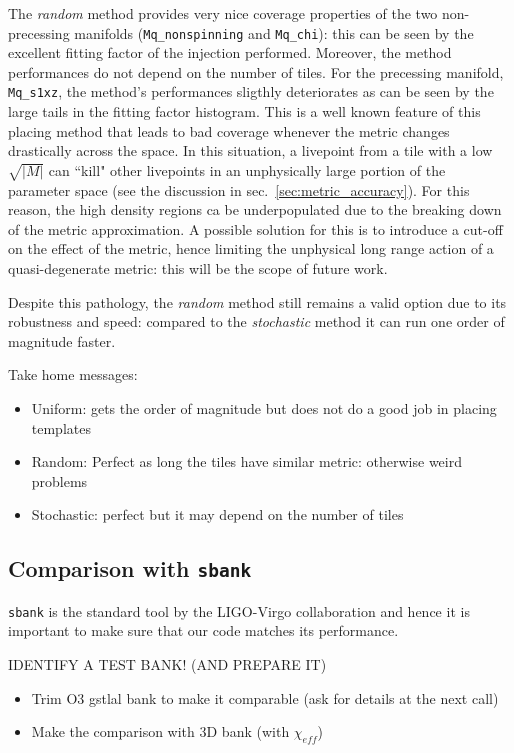 \documentclass[twocolumn,showpacs,preprintnumbers,nofootinbib,prd,
superscriptaddress,10pt]{revtex4-1}
\begin{document}
The {\it random} method provides very nice coverage properties of the two non-precessing manifolds (\texttt{Mq\_nonspinning} and \texttt{Mq\_chi}): this can be seen by the excellent fitting factor of the injection performed. Moreover, the method performances do not depend on the number of tiles.
For the precessing manifold, \texttt{Mq\_s1xz}, the method's performances sligthly deteriorates as can be seen by the large tails in the fitting factor histogram.
This is a well known feature of this placing method that leads to bad coverage whenever the metric changes drastically across the space. In this situation, a livepoint from a tile with a low $\sqrt{|M|}$ can ``kill" other livepoints in an unphysically large portion of the parameter space (see the discussion in sec.~\ref{sec:metric_accuracy}). For this reason, the high density regions ca be underpopulated due to the breaking down of the metric approximation. A possible solution for this is to introduce a cut-off on the effect of the metric, hence limiting the unphysical long range action of a quasi-degenerate metric: this will be the scope of future work.

Despite this pathology, the {\it random} method still remains a valid option due to its robustness and speed: compared to the {\it stochastic} method it can run one order of magnitude faster.






Take home messages:
\begin{itemize}
	\item Uniform: gets the order of magnitude but does not do a good job in placing templates
	\item Random: Perfect as long the tiles have similar metric: otherwise weird problems
	\item Stochastic: perfect but it may depend on the number of tiles
\end{itemize}



\subsection{Comparison with \texttt{sbank} }\label{sec:sbank_comparison}

\texttt{sbank} is the standard tool by the LIGO-Virgo collaboration and hence it is important to make sure that our code matches its performance.

IDENTIFY A TEST BANK! (AND PREPARE IT)
	\begin{itemize}
		\item Trim O3 gstlal bank to make it comparable (ask for details at the next call)
		\item Make the comparison with 3D bank (with $\chi_{eff}$)
	\end{itemize}
\end{document}
